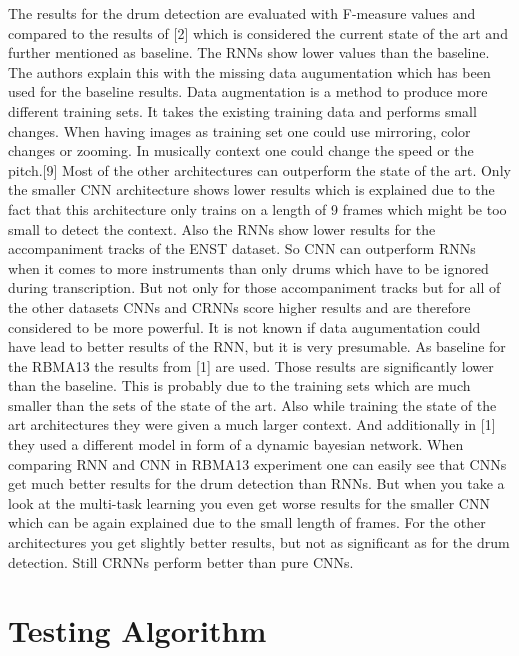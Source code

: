 \documentclass[11pt,twocolumn]{article}
\begin{document}
The results for the drum detection are evaluated with F-measure values and compared to the results of [2] which is considered the current state of the art and further mentioned as baseline.\newline
The RNNs show lower values than the baseline. The authors explain this with the missing data augumentation which has been used for the baseline results.\newline
Data augmentation is a method to produce more different training sets. It takes the existing training data and performs small changes. When having images as training set one could use mirroring, color changes or zooming. In musically context one could change the speed or the pitch.[9]\newline
Most of the other architectures can outperform the state of the art. Only the smaller CNN architecture shows lower results which is explained due to the fact that this architecture only trains on a length of 9 frames which might be too small to detect the context. Also the RNNs show lower results for the accompaniment tracks of the ENST dataset. So CNN can outperform RNNs when it comes to more instruments than only drums which have to be ignored during transcription. But not only for those accompaniment tracks but for all of the other datasets CNNs and CRNNs score higher results and are therefore considered to be more powerful.\newline
It is not known if data augumentation could have lead to better results of the RNN, but it is very presumable.\newline
As baseline for the RBMA13 the results from [1] are used. Those results are significantly lower than the baseline. This is probably due to the training sets which are much smaller than the sets of the state of the art. Also while training the state of the art architectures they were given a much larger context. And additionally in [1] they used a different model in form of a dynamic bayesian network.\newline
When comparing RNN and CNN in RBMA13 experiment one can easily see that CNNs get much better results for the drum detection than RNNs. But when you take a look at the multi-task learning you even get worse results for the smaller CNN which can be again explained due to the small length of frames. For the other architectures you get slightly better results, but not as significant as for the drum detection. Still CRNNs perform better than pure CNNs.

\section*{Testing Algorithm}
\end{document}
